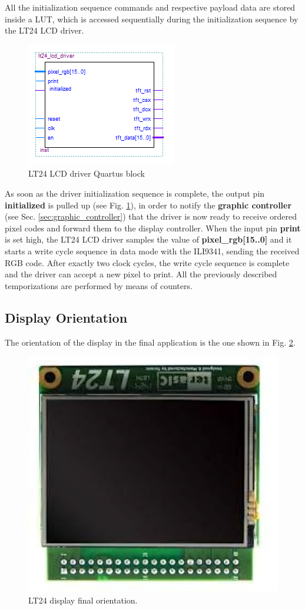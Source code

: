 \documentclass[11pt]{report}
\begin{document}
All the initialization sequence commands and respective payload data are stored inside a LUT, which is accessed sequentially during the initialization sequence by the LT24 LCD driver.

\begin{figure}[!h]
    \centering
    \includegraphics[width=0.5\linewidth]{images/graphic_interface_design/LT24_LCD_driver/lcd_driver_quartus_block.png}
    \caption{LT24 LCD driver Quartus block}
    \label{fig:lcd_driver_quartus_block}
\end{figure}

As soon as the driver initialization sequence is complete, the output pin \textbf{initialized} is pulled up (see Fig. \ref{fig:lcd_driver_quartus_block}), in order to notify the \textbf{graphic controller} (see Sec. \ref{sec:graphic_controller}) that the driver is now ready to receive ordered pixel codes and forward them to the display controller. When the input pin \textbf{print} is set high, the LT24 LCD driver samples the value of \textbf{pixel\_rgb[15..0]} and it starts a write cycle sequence in data mode with the ILI9341, sending the received RGB code. After exactly two clock cycles, the write cycle sequence is complete and the driver can accept a new pixel to print. All the previously described temporizations are performed by means of counters.

\subsection{Display Orientation}

The orientation of the display in the final application is the one shown in Fig. \ref{fig:lcd_orientation}.

\begin{figure}[!h]
    \centering
    \includegraphics[width=0.5\linewidth]{images/graphic_interface_design/LT24_LCD_driver/LCD_orientation.png}
    \caption{LT24 display final orientation.}
    \label{fig:lcd_orientation}
\end{figure}
\end{document}
